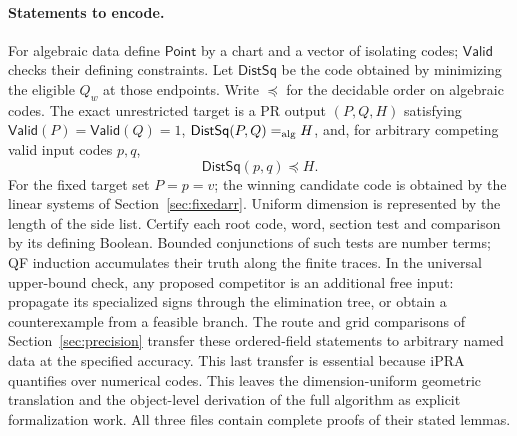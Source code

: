 \documentclass[10pt,letterpaper]{article}
\begin{document}
\paragraph{Statements to encode.}
For algebraic data define $\mathsf{Point}$ by a chart and a vector of isolating codes; $\mathsf{Valid}$ checks their defining constraints. Let $\mathsf{DistSq}$ be the code obtained by minimizing the eligible $Q_w$ at those endpoints. Write $\preceq$ for the decidable order on algebraic codes. The exact unrestricted target is a PR output $(P,Q,H)$ satisfying $\mathsf{Valid}(P)=\mathsf{Valid}(Q)=1$, $\mathsf{DistSq}(P,Q)=_{\rm alg}H$, and, for arbitrary competing valid input codes $p,q$,
\[
                        \mathsf{DistSq}(p,q)\preceq H.
\]
For the fixed target set $P=p=v$; the winning candidate code is obtained by the linear systems of Section~\ref{sec:fixedarr}. Uniform dimension is represented by the length of the side list. Certify each root code, word, section test and comparison by its defining Boolean. Bounded conjunctions of such tests are number terms; QF induction accumulates their truth along the finite traces. In the universal upper-bound check, any proposed competitor is an additional free input: propagate its specialized signs through the elimination tree, or obtain a counterexample from a feasible branch. The route and grid comparisons of Section~\ref{sec:precision} transfer these ordered-field statements to arbitrary named data at the specified accuracy. This last transfer is essential because iPRA quantifies over numerical codes.
This leaves the dimension-uniform geometric translation and the
object-level derivation of the full algorithm as explicit formalization
work. All three files contain complete proofs of their stated lemmas.
\end{document}
